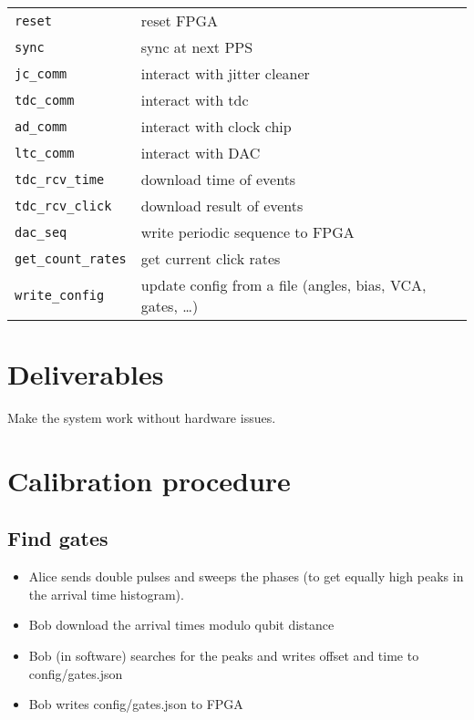 \documentclass[10pt]{article}
\begin{document}
\begin{tabular}{l l}
    {\tt reset} & reset FPGA \\
    {\tt sync} & sync at next PPS  \\
    {\tt jc\_comm} & interact with jitter cleaner \\
    {\tt tdc\_comm} & interact with tdc \\
    {\tt ad\_comm} & interact with clock chip \\
    {\tt ltc\_comm} & interact with DAC \\
    {\tt tdc\_rcv\_time} & download time of events \\
    {\tt tdc\_rcv\_click} & download result of events \\
    {\tt dac\_seq} & write periodic sequence to FPGA \\
    {\tt get\_count\_rates} & get current click rates \\
    {\tt write\_config} & update config from a file (angles, bias, VCA, gates, \dots) \\
\end{tabular}



\section{Deliverables}

Make the system work without hardware issues.

\section{Calibration procedure}

\subsection{Find gates}

\begin{itemize}
    \item Alice sends double pulses and sweeps the phases (to get equally high peaks in the arrival time histogram). 
    \item Bob download the arrival times modulo qubit distance
    \item Bob (in software) searches for the peaks and writes offset and time to config/gates.json
    \item Bob writes config/gates.json to FPGA
\end{itemize}
\end{document}
